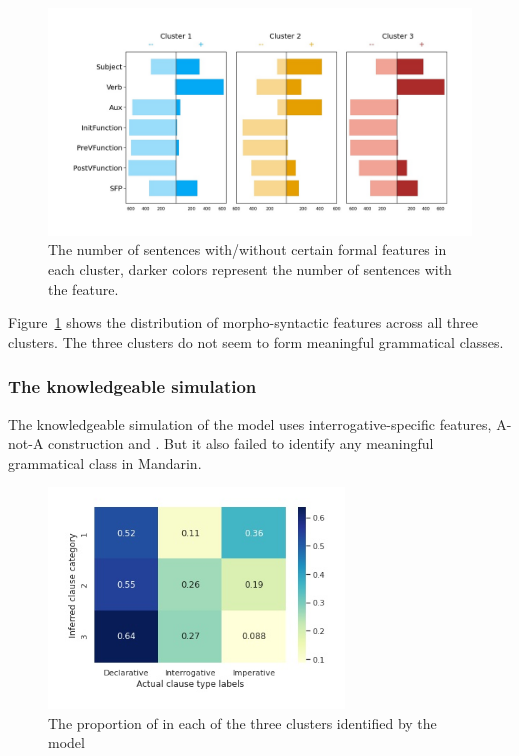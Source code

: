 \begin{figure}[H]
    \centering
    \includegraphics[width=1\textwidth]{figures/man-baseline-conservative-syncluster.jpg}
    \caption{The number of sentences with/without certain formal features in each cluster, darker colors represent the number of sentences with the feature. }
    \label{fig:man-baseline-syncluster}
\end{figure}

Figure~\ref{fig:man-baseline-syncluster} shows the distribution of morpho-syntactic features across all three clusters. The three clusters do not seem to form meaningful grammatical classes.

\subsubsection{The knowledgeable simulation}
The knowledgeable simulation of the \dlearnerabbr{} model uses interrogative-specific features, \textpm A-not-A construction and \textpm {}. But it also failed to identify any meaningful grammatical class in Mandarin.

\begin{figure}[H]
    \centering
    \includegraphics[width=0.7\textwidth]{figures/man-baseline-mid-heat.jpg}
    \caption{The proportion of \diis{} in each of the three clusters identified by the \dlearnerabbr{} model}
    \label{fig:man-baseline-mid-heat}
\end{figure}



